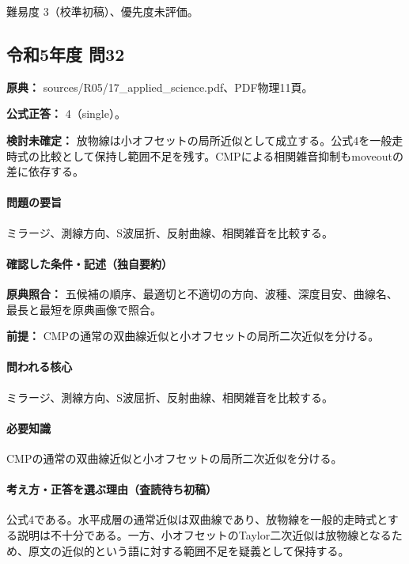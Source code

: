 \par 難易度 3（校準初稿）、優先度未評価。

\subsection{令和5年度 問32}
\label{q:r05-reg-applied-32}

\noindent\textbf{原典：} sources/R05/17\_applied\_science.pdf、PDF物理11頁。

\textbf{公式正答：} 4（single）。

\par\textbf{検討未確定：} 放物線は小オフセットの局所近似として成立する。公式4を一般走時式の比較として保持し範囲不足を残す。CMPによる相関雑音抑制もmoveoutの差に依存する。

\paragraph{問題の要旨} ミラージ、測線方向、S波屈折、反射曲線、相関雑音を比較する。

\paragraph{確認した条件・記述（独自要約）}\mbox{}\par

\noindent\textbf{原典照合：} 五候補の順序、最適切と不適切の方向、波種、深度目安、曲線名、最長と最短を原典画像で照合。\par

\noindent\textbf{前提：} CMPの通常の双曲線近似と小オフセットの局所二次近似を分ける。\par

\paragraph{問われる核心} ミラージ、測線方向、S波屈折、反射曲線、相関雑音を比較する。

\paragraph{必要知識} CMPの通常の双曲線近似と小オフセットの局所二次近似を分ける。

\paragraph{考え方・正答を選ぶ理由（査読待ち初稿）} 公式4である。水平成層の通常近似は双曲線であり、放物線を一般的走時式とする説明は不十分である。一方、小オフセットのTaylor二次近似は放物線となるため、原文の近似的という語に対する範囲不足を疑義として保持する。

